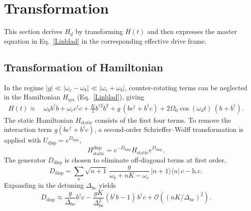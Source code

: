 \section{Transformation}
\label{transformation}
This section derives $H_d$ by transforming $H(t)$ and then expresses the master equation in Eq.~\eqref{Linblad} in the corresponding effective drive frame.

\subsection{Transformation of Hamiltonian}
In the regime $|g| \ll |\omega_c-\omega_b|\ll|\omega_c+\omega_b|$, counter-rotating terms can be neglected in the Hamiltonian $H_\text{sys}$ (Eq.\ \eqref{Linblad}), giving
\begin{equation}
\begin{split}
    H(t) \approx \,& \omega_b b^\dagger b + \omega_c c^\dagger c + \frac{K}{2} b^{\dagger 2} b^2+ g\,(bc^\dagger + b^\dagger c) + 2\Omega_0 \cos(\omega_d t)\,(b + b^\dagger).
\end{split}
\end{equation}
The static Hamiltonian $H_{\text{static}}$ consists of the first four terms. To remove the interaction term $g(bc^\dagger + b^\dagger c)$, a second-order Schrieffer--Wolff transformation is applied with $U_{\text{disp}} = e^{D_{\text{disp}}}$,
\begin{equation}
    H_{\text{static}}^{\text{disp}} = e^{-D_{\text{disp}}} H_{\text{static}} e^{D_{\text{disp}}}.
\end{equation}
The generator $D_{\text{disp}}$ is chosen to eliminate off-diagonal terms at first order,
\begin{equation}
\label{Ddisp}
    D_{\text{disp}} = \sum_n \sqrt{n+1}\,
    \frac{g}{\omega_b + nK - \omega_c}\,
    |n+1\rangle \langle n|\, c - \text{h.c.}
\end{equation}
Expanding in the detuning $\Delta_{\text{bc}}$ yields
\begin{equation}
    D_{\text{disp}} \approx
    \frac{g}{\Delta_{\text{bc}}} b^\dagger c
    - \frac{gK}{\Delta_{\text{bc}}^2} (b^\dagger b - 1)\, b^\dagger c
    + \mathcal{O}\!\left((nK/\Delta_{\text{bc}})^2\right).
\end{equation}

